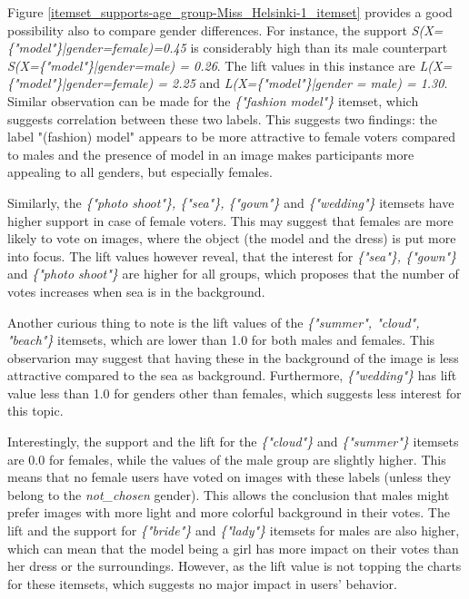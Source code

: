 Figure \ref{itemset_supports-age_group-Miss_Helsinki-1_itemset} provides a good possibility also to compare gender differences. For instance, the support \emph{S(X=\{"model"\}|gender=female)=0.45} is considerably high than its male counterpart \emph{S(X=\{"model"\}|gender=male) = 0.26}. The lift values in this instance are \emph{L(X=\{"model"\}|gender=female) = 2.25} and \emph{L(X=\{"model"\}|gender = male) = 1.30}. Similar observation can be made for the \emph{\{"fashion model"\}} itemset, which suggests correlation between these two labels. This suggests two findings: the label "(fashion) model" appears to be more attractive to female voters compared to males and the presence of model in an image makes participants more appealing to all genders, but especially females. 

Similarly, the \emph{\{"photo shoot"\}, \{"sea"\}, \{"gown"\}} and \emph{\{"wedding"\}} itemsets have higher support in case of female voters. This may suggest that females are more likely to vote on images, where the object (the model and the dress) is put more into focus. The lift values however reveal, that the interest for \emph{\{"sea"\}, \{"gown"\}} and \emph{\{"photo shoot"\}} are higher for all groups, which proposes that the number of votes increases when sea is in the background. 

Another curious thing to note is the lift values of the \emph{\{"summer", "cloud", "beach"\}} itemsets, which are lower than 1.0 for both males and females. This observarion may suggest that having these in the background of the image is less attractive compared to the sea as background. Furthermore, \emph{\{"wedding"\}} has lift value less than 1.0 for genders other than females, which suggests less interest for this topic.  

Interestingly, the support and the lift for the \emph{\{"cloud"\}} and \emph{\{"summer"\}} itemsets are 0.0 for females, while the values of the male group are slightly higher. This means that no female users have voted on images with these labels (unless they belong to the \emph{not\_chosen} gender). This allows the conclusion that males might prefer images with more light and more colorful background in their votes. The lift and the support for \emph{\{"bride"\}} and \emph{\{"lady"\}} itemsets for males are also higher, which can mean that the model being a girl has more impact on their votes than her dress or the surroundings. However, as the lift value is not topping the charts for these itemsets, which suggests no major impact in users' behavior.

